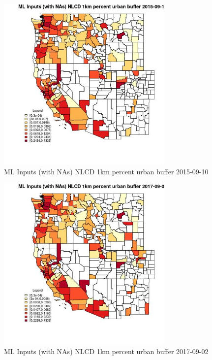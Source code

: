 \begin{figure} 
\centering  
\includegraphics[width=0.77\textwidth]{Code_Outputs/Report_ML_input_PM25_Step4_part_e_de_duplicated_aves_compiled_2019-05-21wNAs_CountyNLCD_1km_percent_urban_bufferMean2015-09-10.jpg} 
\caption{\label{fig:Report_ML_input_PM25_Step4_part_e_de_duplicated_aves_compiled_2019-05-21wNAsCountyNLCD_1km_percent_urban_bufferMean2015-09-10}ML Inputs (with NAs) NLCD 1km percent urban buffer 2015-09-10} 
\end{figure} 
 

\begin{figure} 
\centering  
\includegraphics[width=0.77\textwidth]{Code_Outputs/Report_ML_input_PM25_Step4_part_e_de_duplicated_aves_compiled_2019-05-21wNAs_CountyNLCD_1km_percent_urban_bufferMean2017-09-02.jpg} 
\caption{\label{fig:Report_ML_input_PM25_Step4_part_e_de_duplicated_aves_compiled_2019-05-21wNAsCountyNLCD_1km_percent_urban_bufferMean2017-09-02}ML Inputs (with NAs) NLCD 1km percent urban buffer 2017-09-02} 
\end{figure} 
 

